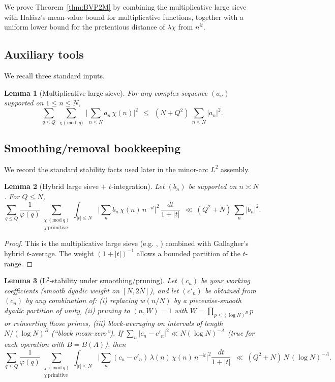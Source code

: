 \documentclass[11pt]{article}
\newtheorem{lemma}{Lemma}[part]
\theoremstyle{definition}
\theoremstyle{remark}
\numberwithin{equation}{part}
\begin{document}
We prove Theorem~\ref{thm:BVP2M} by combining the multiplicative large sieve with Halász's mean-value bound for multiplicative functions, together with a uniform lower bound for the pretentious distance of $\lambda\chi$ from $n^{it}$.

\subsection*{Auxiliary tools}
We recall three standard inputs.

\begin{lemma}[Multiplicative large sieve]\label{lem:mls}
	For any complex sequence $(a_n)$ supported on $1\le n\le N$,
	\[
		\sum_{q\le Q}\ \sum_{\chi\!\!\!\pmod q}\ \Big|\sum_{n\le N} a_n\,\chi(n)\Big|^2
		\ \ \le\ \ (N+Q^2)\ \sum_{n\le N} |a_n|^2.
	\]
\end{lemma}

\subsection*{Smoothing/removal bookkeeping}\label{subsec:smoothing-book}
We record the standard stability facts used later in the minor-arc $L^2$ assembly.

\begin{lemma}[Hybrid large sieve $+$ $t$-integration]\label{lem:hybrid-ls}
	Let $(b_n)$ be supported on $n\asymp N$. For $Q\le N$,
	\[
		\sum_{q\le Q} \frac{1}{\varphi(q)}
		\sum_{\substack{\chi\ (\mathrm{mod}\ q)\\ \chi\ \mathrm{primitive}}}
		\int_{|t|\le N}
		\Big|\sum_{n} b_n\,\chi(n)\,n^{-it}\Big|^2\,\frac{dt}{1+|t|}
		\ \ \ll\ (Q^2+N)\ \sum_{n}|b_n|^2.
	\]
\end{lemma}

\begin{proof}
	This is the multiplicative large sieve (e.g. \cite[Ch.~7]{MV}, \cite[Thm.~3.13]{IK}) combined with Gallagher's hybrid \(t\)-average. The weight \((1+|t|)^{-1}\) allows a bounded partition of the \(t\)-range.
\end{proof}


\begin{lemma}[L$^2$-stability under smoothing/pruning]\label{lem:l2-smooth}
	Let $(c_n)$ be your working coefficients (smooth dyadic weight on $[N,2N]$), and let $(c'_n)$ be obtained from $(c_n)$ by any combination of:
	(i) replacing $w(n/N)$ by a piecewise-smooth dyadic partition of unity,
	(ii) pruning to $(n,W)=1$ with $W=\prod_{p\le (\log N)^B}p$ or reinserting those primes,
	(iii) block-averaging on intervals of length $N/(\log N)^B$ (“block mean-zero”).
	If $\sum_n |c_n-c'_n|^2 \ll N(\log N)^{-A}$ (true for each operation with $B=B(A)$), then
	\[
		\sum_{q\le Q} \frac{1}{\varphi(q)}\!\!
		\sum_{\substack{\chi\ (\mathrm{mod}\ q)\\ \chi\ \mathrm{primitive}}}
		\!\int_{|t|\le N}\!
		\Big|\sum_{n} (c_n-c'_n)\,\lambda(n)\,\chi(n)\,n^{-it}\Big|^2\frac{dt}{1+|t|}
		\ \ \ll\ (Q^2+N)\,N\,(\log N)^{-A}.
	\]
\end{lemma}
\end{document}
